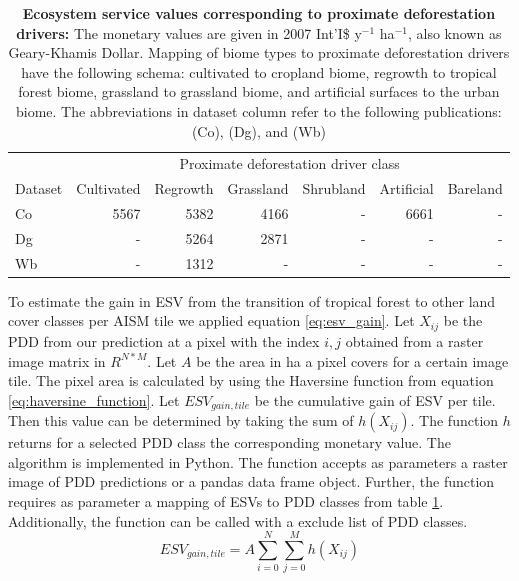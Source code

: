 		\begin{table}[ht]
			\centering
			\caption[Ecosystem service values corresponding to proximate deforestation drivers]{\textbf{Ecosystem service values corresponding to proximate deforestation drivers:} The monetary values are given in 2007 Int'I\$ y$^{-1}$ ha$^{-1}$, also known as Geary-Khamis Dollar. Mapping of biome types to proximate deforestation drivers have the following schema: cultivated to cropland biome, regrowth to tropical forest biome, grassland to grassland biome, and artificial surfaces to the urban biome. The abbreviations in dataset column refer to the following publications: \citet{Costanza2014} (Co), \citet{Groot2012} (Dg), and \citet{Siikamaki2015} (Wb)}
			\label{tab:esv_mapping}
			\begin{tabular}{lrrrrrr}
				\hline
				& \multicolumn{6}{c}{Proximate deforestation driver class} \\\cline{2-7}
				Dataset & Cultivated & Regrowth & Grassland & Shrubland &  Artificial & Bareland \\
				\hline
				Co & 5567 & 5382 & 4166 & - & 6661 & - \\
				Dg & - & 5264 & 2871 & - & - & - \\
				Wb & - & 1312 & - & - & - & - \\
				\hline
			\end{tabular}
		\end{table}
		To estimate the gain in \ac{ESV} from the transition of tropical forest to other land cover classes per \ac{AISM} tile we applied equation \ref{eq:esv_gain}. Let $X_{ij}$ be the \ac{PDD} from our prediction at a pixel with the index $i,j$ obtained from a raster image matrix in $R^{N*M}$. Let $A$ be the area in ha a pixel covers for a certain image tile. The pixel area is calculated by using the Haversine function from equation \ref{eq:haversine_function}. Let $ESV_{gain,tile}$ be the cumulative gain of \ac{ESV} per tile. Then this value can be determined by taking the sum of $h(X_{ij})$. The function $h$ returns for a selected \ac{PDD} class the corresponding monetary value. The algorithm is implemented in Python. The function accepts as parameters a raster image of \ac{PDD} predictions or a pandas data frame object. Further, the function requires as parameter a mapping of \acp{ESV} to \ac{PDD} classes from table \ref{tab:esv_mapping}. Additionally, the function can be called with a exclude list of \ac{PDD} classes.
		\begin{equation}
		\label{eq:esv_gain}
			ESV_{gain,tile} = A\displaystyle\sum_{i=0}^{N}\displaystyle\sum_{j=0}^{M} h(X_{ij})
		\end{equation}
